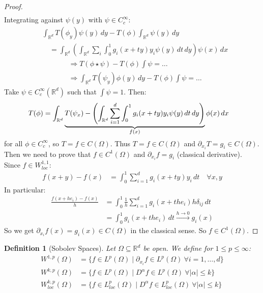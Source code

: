 \documentclass{report}
\theoremstyle{tommy}
\newtheorem{defn}{Definition}
\begin{document}
\begin{proof}
\begin{align*}
    \end{align*}
    Integrating against \(\psi(y)\) with \(\psi \in C_c^\infty\):
    \begin{align*}
      &\int_{\mathbb{R}^d} T(\phi_y) \psi(y) \, dy - T(\phi) \int_{\mathbb{R}^d} \psi(y) \, dy  \\
      &\quad = \int_{\mathbb{R}^d} \left(\int_{\mathbb{R}^d} \sum_{i} \int_0^1 g_i (x + ty) y_i \psi(y) \, dt \, dy \right) \psi(x) \, dx
    \end{align*}
    \begin{align*}
      &\Rightarrow T(\phi \star \psi) - T(\phi)\int \psi = \dots \\
      &\Rightarrow \int_{\mathbb{R}^d} T(\psi_y) \phi(y) \, dy - T(\phi) \int \psi = \dots
    \end{align*}
    Take \(\psi \in C_c^\infty(\mathbb{R}^d)\) such that \(\int \psi = 1\). Then:
    \begin{align*}
      T(\phi)
      &= \int_{\mathbb{R}^d} \underbrace{T(\psi_x) - \left(\int_{\mathbb{R}^d} \sum_{i=1}^d \int_0^1 g_i(x + ty) y_i \psi(y) \, dt \, dy\right)}_{\smash{f(x)}} \phi(x) \, dx
    \end{align*}
    for all \(\phi \in C_c^\infty\), so \(T = f \in C(\Omega)\). Thus \(T = f \in C(\Omega)\) and \(\partial_{x_i} T = g_i \in C(\Omega)\). Then we need to prove that \(f \in C^1(\Omega)\) and \(\partial_{x_i} f = g_i\) (classical derivative). Since \(f \in W_{loc}^{1,1}\):
    \begin{align*}
      f(x + y) - f(x)
      &= \int_0^1 \sum_{i=1}^d g_i(x + ty)y_i \, dt \quad \forall x,y
    \end{align*}
    In particular:
    \begin{align*}
      \frac{f(x + h e_i) - f(x)}{h}
      &= \int_0^1 \frac{1}{h} \sum_{i=1}^d g_i (x + the_i) h \delta_{ij} \, dt \\
      &= \int_0^1 g_i(x + the_i) \, dt \xrightarrow{h \to 0} g_i(x)
    \end{align*}
    So we get \(\partial_{x_i} f(x) = g_i(x) \in C(\Omega)\) in the classical sense. So \(f \in C^1(\Omega)\).
  \end{proof}
  
  \begin{defn}[Sobolev Spaces]
    Let \(\Omega \subseteq \mathbb{R}^d\) be open. We define for \(1 \le p\le \infty\):
    \begin{align*}
      W^{1, p}(\Omega)
      &= \{f \in L^p(\Omega) \mid \partial_{x_i} f \in L^p(\Omega)\ \forall i=1, \dots, d \} \\
      W^{k, p}(\Omega)
      &= \{f \in L^p(\Omega) \mid D^\alpha f \in L^p(\Omega) \ \forall |\alpha|\le k \} \\
      W^{k, p}_{loc}(\Omega)
      &= \{f \in L_{loc}^p(\Omega) \mid D^\alpha f \in L_{loc}^p(\Omega) \ \forall |\alpha|\le k \}
    \end{align*}
  \end{defn}
  
\end{document}
